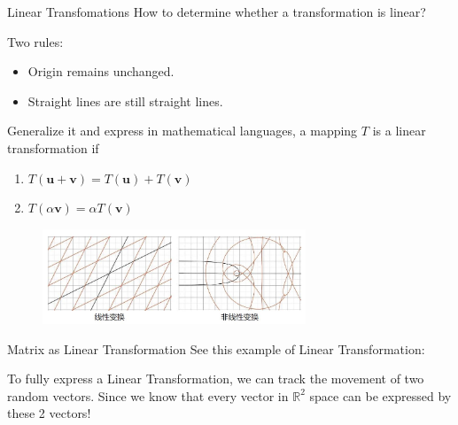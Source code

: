 \documentclass{beamer}
\begin{document}
\begin{frame}{Linear Transfomations}
How to determine whether a transformation is linear?

\vspace{5pt}
Two rules:
\begin{itemize}
    \item Origin remains unchanged.
    \item Straight lines are still straight lines.
\end{itemize}

Generalize it and express in mathematical languages, a mapping $T$ is a linear transformation if
\begin{enumerate}
    \item $T\left( \mathbf{u}+\mathbf{v} \right) =T\left( \mathbf{u} \right) +T\left( \mathbf{v} \right)$
    \item $T\left( \alpha \mathbf{v} \right) =\alpha T\left( \mathbf{v} \right) $
\end{enumerate}
\begin{figure}
    \centering
    \includegraphics[width=0.7\textwidth]{lt.jpeg}
\end{figure}
\end{frame}

\begin{frame}{Matrix as Linear Transformation}
See this example of Linear Transformation:

\begin{figure}
    \centering
\end{figure}

To fully express a Linear Transformation, we can track the movement of two random vectors. Since we know that every vector in $\mathbb{R}^2$ space can be expressed by these 2 vectors!
\end{frame}
\end{document}
